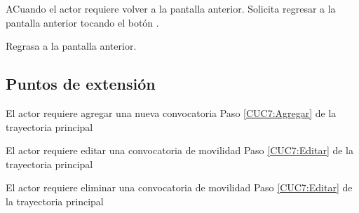 	\begin{UCtrayectoriaA}{A}{Cuando el actor requiere volver a la pantalla anterior.}
		\UCpaso[\UCactor] Solicita regresar a la pantalla anterior tocando el botón .
		
		\UCpaso [\UCsist] Regrasa a la pantalla anterior.
	\end{UCtrayectoriaA}
	
	\subsection{Puntos de extensión}
	
	\UCExtensionPoint
	{El actor requiere agregar una nueva convocatoria}
	{ Paso \ref{CUC7:Agregar} de la trayectoria principal}
	{}
	
	\UCExtensionPoint
	{El actor requiere editar una convocatoria de movilidad}
	{ Paso \ref{CUC7:Editar} de la trayectoria principal}
	{}
	
	\UCExtensionPoint
	{El actor requiere eliminar una convocatoria de movilidad}
	{ Paso \ref{CUC7:Editar} de la trayectoria principal}
	{}
